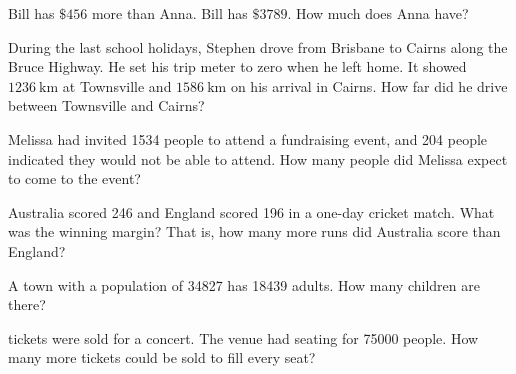 \begin{questions}
\begin{multicols}{3}
    \end{multicols}
    \Question[2] Bill has \(\$ 456\) more than Anna. Bill has \(\$ 3789\). How much does Anna have?
            \begin{solutionordottedlines}[1in]
            \end{solutionordottedlines}
    \Question[2] During the last school holidays, Stephen drove from Brisbane to Cairns along the Bruce Highway. He set his trip meter to zero when he left home. It showed \(1236 \mathrm{~km}\) at Townsville and \(1586 \mathrm{~km}\) on his arrival in Cairns. How far did he drive between Townsville and Cairns?
            \begin{solutionordottedlines}[1in]
            \end{solutionordottedlines}
    \Question[2] Melissa had invited 1534 people to attend a fundraising event, and 204 people indicated they would not be able to attend. How many people did Melissa expect to come to the event?
            \begin{solutionordottedlines}[1in]
            \end{solutionordottedlines}
    \Question[2] Australia scored 246 and England scored 196 in a one-day cricket match. What was the winning margin? That is, how many more runs did Australia score than England?
            \begin{solutionordottedlines}[1in]
            \end{solutionordottedlines}
    \Question[2] A town with a population of 34827 has 18439 adults. How many children are there?
            \begin{solutionordottedlines}[1in]
            \end{solutionordottedlines}
     tickets were sold for a concert. The venue had seating for 75000 people. How many more tickets could be sold to fill every seat?
            \begin{solutionordottedlines}[1in]
            \end{solutionordottedlines}
\end{questions}


